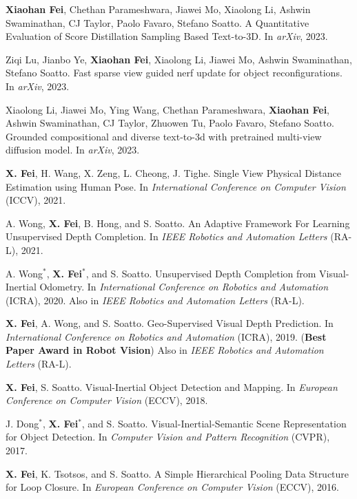 \documentclass[margin, line, 10pt]{res} %
\begin{document}
\begin{resume}
\begin{enumerate}[label={[\bf\arabic*]},leftmargin=*]
\item 
{\bf Xiaohan Fei}, Chethan Parameshwara, Jiawei Mo, Xiaolong Li, Ashwin Swaminathan, CJ Taylor, Paolo Favaro, Stefano Soatto. A Quantitative Evaluation of Score Distillation Sampling Based Text-to-3D. In \textit{arXiv}, 2023.

\item 
Ziqi Lu, Jianbo Ye, {\bf Xiaohan Fei}, Xiaolong Li, Jiawei Mo, Ashwin Swaminathan, Stefano Soatto.
Fast sparse view guided nerf update for object reconfigurations. In \textit{arXiv}, 2023.

\item 
Xiaolong Li, Jiawei Mo, Ying Wang, Chethan Parameshwara, {\bf Xiaohan Fei}, Ashwin Swaminathan, CJ Taylor, Zhuowen Tu, Paolo Favaro, Stefano Soatto. Grounded compositional and diverse text-to-3d with pretrained multi-view diffusion model. In \textit{arXiv}, 2023.

\item
{\bf X. Fei}, H. Wang, X. Zeng, L. Cheong, J. Tighe. Single View Physical Distance Estimation using Human Pose. In \textit{International Conference on Computer Vision} (ICCV), 2021.
\item
A. Wong, {\bf X. Fei}, B. Hong, and S. Soatto. An Adaptive Framework For Learning Unsupervised Depth Completion. In \textit{IEEE Robotics and Automation Letters} (RA-L), 2021.
\item
A. Wong$^*$, {\bf X. Fei}$^*$, and S. Soatto. Unsupervised Depth Completion from Visual-Inertial Odometry.
In \textit{International Conference on Robotics and Automation} (ICRA), 2020. Also in \textit{IEEE Robotics and Automation Letters} (RA-L).
\item 
{\bf X. Fei}, A. Wong, and S. Soatto. Geo-Supervised Visual Depth Prediction. 
In \textit{International Conference on Robotics and Automation} (ICRA), 2019. 
(\textbf{Best Paper Award in Robot Vision})
Also in \textit{IEEE Robotics and Automation Letters} (RA-L).
\item 
{\bf X. Fei}, S. Soatto. Visual-Inertial Object Detection and Mapping. 
In \textit{European Conference on Computer Vision} (ECCV), 2018.
\item 
J. Dong$^*$, {\bf X. Fei}$^*$, and S. Soatto. Visual-Inertial-Semantic Scene Representation for Object Detection. 
In \textit{Computer Vision and Pattern Recognition} (CVPR), 2017.
\item 
{\bf X. Fei}, K. Tsotsos, and S. Soatto. A Simple Hierarchical Pooling Data Structure for Loop Closure. 
In \textit{European Conference on Computer Vision} (ECCV), 2016.
\end{enumerate}


\end{resume}
\end{document}
